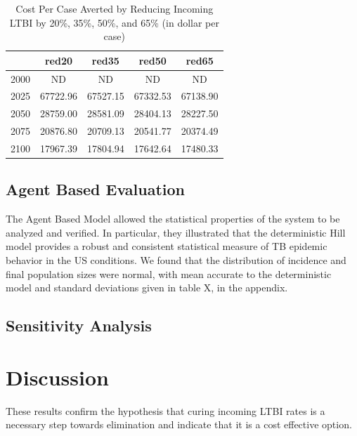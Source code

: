 \documentclass{amsart}
\begin{document}
\begin{table}
\centering
\begin{tabular}{|r|cccc|}
  \hline
 & red20 & red35 & red50 & red65 \\ 
  \hline
2000 & ND & ND & ND & ND \\ 
  2025 & 67722.96 & 67527.15 & 67332.53 & 67138.90 \\ 
  2050 & 28759.00 & 28581.09 & 28404.13 & 28227.50 \\ 
  2075 & 20876.80 & 20709.13 & 20541.77 & 20374.49 \\ 
  2100 & 17967.39 & 17804.94 & 17642.64 & 17480.33 \\ 
   \hline
\end{tabular}
\caption{Cost Per Case Averted by Reducing Incoming LTBI by 20\%, 35\%, 50\%, and 65\% (in dollar per case)} 
\label{tab:cpcaRes}
\end{table}

\subsection{Agent Based Evaluation}
The Agent Based Model allowed the statistical properties of the system to be
analyzed and verified. In particular, they illustrated that the deterministic
Hill model provides a robust and consistent statistical measure of TB epidemic
behavior in the US conditions. We found that the distribution of incidence and
final population sizes were normal, with mean accurate to the deterministic
model and standard deviations given in table X, in the appendix. 

\subsection{Sensitivity Analysis}
\section{Discussion}
These results confirm the hypothesis that curing incoming LTBI rates is a
necessary step towards elimination and indicate that it is a cost effective
option. 
\end{document}
